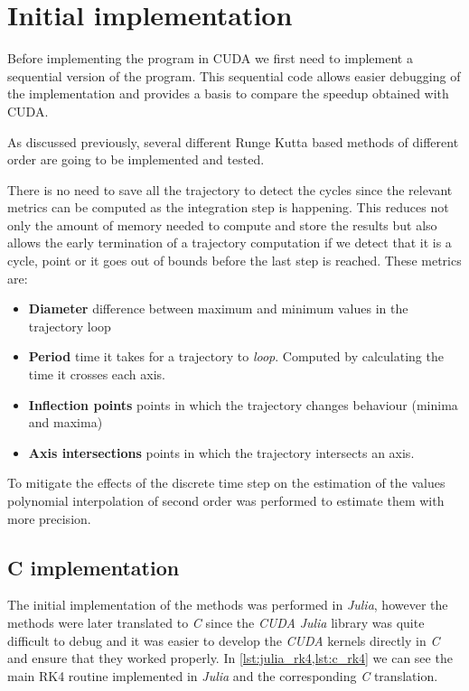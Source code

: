 
\section{Initial implementation}%
\label{sec:initial_implementation}

Before implementing the program in CUDA we first need to implement a sequential
version of the program. This sequential code allows easier debugging of the
implementation and provides a basis to compare the speedup obtained with CUDA.

As discussed previously, several different Runge Kutta based methods of different order
are going to be implemented and tested.

There is no need to save all the trajectory to detect the cycles since the
relevant metrics can be computed as the integration step is happening.
This reduces not only the amount of memory needed to compute and store the
results but also allows the early termination of a trajectory computation if
we detect that it is a cycle, point or it goes out of bounds before the last
step is reached. These metrics are:

\begin{itemize}
    \item \textbf{Diameter} difference between maximum and minimum values in the
        trajectory loop
    \item \textbf{Period} time it takes for a trajectory to \emph{loop}.
        Computed by calculating the time it crosses each axis.
    \item \textbf{Inflection points} points in which the trajectory changes
        behaviour (minima and maxima)
    \item \textbf{Axis intersections} points in which the trajectory intersects an
        axis.
\end{itemize}

To mitigate the effects of the discrete time step on the estimation of the
values polynomial interpolation of second order was performed to estimate them
with more precision.

\pagebreak
\subsection{C implementation}

The initial implementation of the
methods was performed in \emph{Julia}, however the methods were later translated
to \emph{C} since the \emph{CUDA} \emph{Julia} library was quite difficult to
debug and it was easier to develop the \emph{CUDA} kernels directly in \emph{C}
and ensure that they worked properly. In \cref{lst:julia_rk4,lst:c_rk4} we can
see the main RK4 routine implemented in \emph{Julia} and the corresponding
\emph{C} translation.

